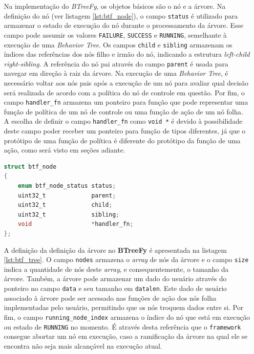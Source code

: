 \documentclass[conference]{IEEEtran}
\begin{document}
Na implementação do \textit{BTreeFy}, os objetos básicos são o nó e a árvore. Na definição do nó (ver listagem \ref{lst:btf_node}), o campo \texttt{status} é utilizado para armazenar o estado de execução do nó durante o processamento da árvore. Esse campo pode assumir os valores \texttt{FAILURE}, \texttt{SUCCESS} e \texttt{RUNNING}, semelhante à execução de uma \textit{Behavior Tree}. Os campos \texttt{child} e \texttt{sibling} armazenam os índices das referências dos nós filho e irmão do nó, indicando a estrutura \textit{left-child right-sibling}. A referência do nó pai através do campo \texttt{parent} é usada para navegar em direção à raiz da árvore. Na execução de uma \textit{Behavior Tree}, é necessário voltar aos nós pais após a execução de um nó para avaliar qual decisão será realizada de acordo com a política do nó de controle em questão. Por fim, o campo \texttt{handler\_fn} armazena um ponteiro para função que pode representar uma função de política de um nó de controle ou uma função de ação de um nó folha. A escolha de definir o campo \texttt{handler\_fn} como \texttt{void *} é devido à possibilidade deste campo poder receber um ponteiro para função de tipos diferentes, já que o protótipo de uma função de política é diferente do protótipo da função de uma ação, como será visto em seções adiante.

\begin{lstlisting}[language=C, caption={Definição do objeto nó no \textit{BTreeFy}}, label={lst:btf_node}]
struct btf_node
{
    enum btf_node_status status;
    uint32_t             parent;
    uint32_t             child;
    uint32_t             sibling;
    void                 *handler_fn;
};
\end{lstlisting}

A definição da definição da árvore no \textbf{BTreeFy} é apresentada na listagem \ref{lst:btf_tree}. O campo \texttt{nodes} armazena o \textit{array} de nós da árvore e o campo \texttt{size} indica a quantidade de nós deste \textit{array}, e consequentemente, o tamanho da árvore. Também, a árvore pode armazenar um dado do usuário através do ponteiro no campo \texttt{data} e seu tamanho em \texttt{datalen}. Este dado de usuário associado à árvore pode ser acessado nas funções de ação dos nós folha implementadas pelo usuário, permitindo que os nós troquem dados entre si. Por fim, o campo \texttt{running\_node\_index} armazena o índice do nó que está em execução ou estado de \texttt{RUNNING} no momento. É através desta referência que o \texttt{framework} consegue abortar um nó em execução, caso a ramificação da árvore na qual ele se encontra não seja mais alcançável na execução atual.
\end{document}
